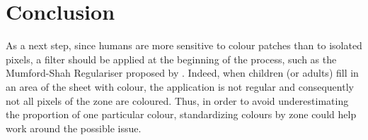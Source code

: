 \documentclass[11pt,a4paper]{article}
\begin{document}
		
		

\section{Conclusion}

As a next step, since humans are more sensitive to colour patches than
to isolated pixels, a filter should be applied at the beginning of the
process, such as the Mumford-Shah Regulariser proposed by
\citet{erdem2009}. Indeed, when children (or adults) fill in an area of
the sheet with colour, the application is not regular and consequently
not all pixels of the zone are coloured. Thus, in order to avoid
underestimating the proportion of one particular colour, standardizing
colours by zone could help work around the possible issue.



\end{document}
